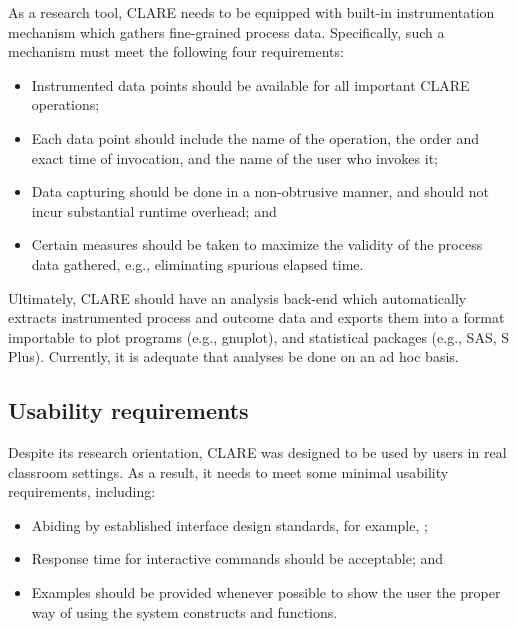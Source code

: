 As a research tool, CLARE needs to be equipped with built-in
instrumentation mechanism which gathers fine-grained process data.
Specifically, such a mechanism must meet the following four requirements:

\begin{itemize}
\item Instrumented data points should be available for all important CLARE
  operations;
  
\item Each data point should include the name of the operation, the order
  and exact time of invocation, and the name of the user who invokes it;
  
\item Data capturing should be done in a non-obtrusive manner, and should
  not incur substantial runtime overhead; and
  
\item Certain measures should be taken to maximize the validity of
  the process data gathered, e.g., eliminating spurious elapsed time.
\end{itemize}

Ultimately, CLARE should have an analysis back-end which
automatically extracts instrumented process and outcome data and exports
them into a format importable to plot programs (e.g., {\sf gnuplot\/}), and
statistical packages (e.g., {\sf SAS}, {\sf S Plus\/}). Currently, it is
adequate that analyses be done on an ad hoc basis.


\subsection{Usability requirements}
\label{sec:usability requirements}

Despite its research orientation, CLARE was designed to be used by users in
real classroom settings. As a result, it needs to meet some minimal
usability requirements, including:

\begin{itemize}
\item Abiding by established interface design standards, for example,
  \cite{Apple87};
  
\item Response time for interactive commands should be acceptable; and
  
\item Examples should be provided whenever possible to show the user the
  proper way of using the system constructs and functions.
\end{itemize}

